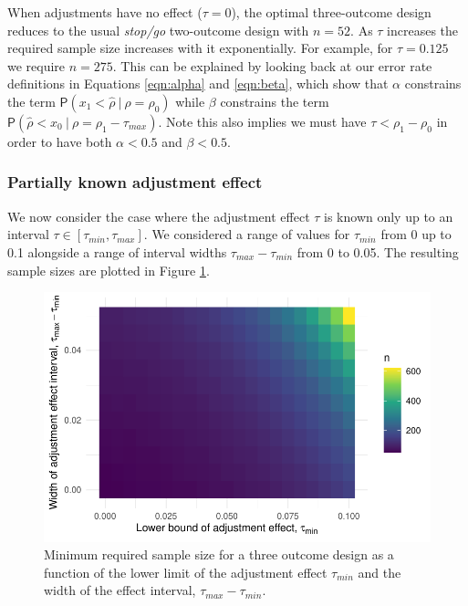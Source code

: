 \documentclass{bmcart}
\newcommand{\PR}{{\mathsf P}}
\begin{document}
When adjustments have no effect ($\tau = 0$), the optimal three-outcome design reduces to the usual \emph{stop/go} two-outcome design with $n = 52$. As $\tau$ increases the required sample size increases with it exponentially. For example, for $\tau = 0.125$ we require $n = 275$. This can be explained by looking back at our error rate definitions in Equations \ref{eqn:alpha} and \ref{eqn:beta}, which show that $\alpha$ constrains the term $\PR(x_1 < \hat{\rho} ~|~ \rho = \rho_0)$ while $\beta$ constrains the term $\PR(\hat{\rho} < x_0 ~|~ \rho = \rho_1 - \tau_{max})$. Note this also implies we must have $\tau < \rho_1 - \rho_0$ in order to have both $\alpha < 0.5$ and $\beta < 0.5$.

\subsubsection{Partially known adjustment effect}

We now consider the case where the adjustment effect $\tau$ is known only up to an interval $\tau \in [\tau_{min}, \tau_{max}]$. We considered a range of values for $\tau_{min}$ from 0 up to 0.1 alongside a range of interval widths $\tau_{max} - \tau_{min}$ from 0 to 0.05. The resulting sample sizes are plotted in Figure \ref{fig:tau_part_ns}.

\begin{figure}
\centering
\includegraphics[scale=0.8]{./figures/tau_part_ns}
\caption{Minimum required sample size for a three outcome design as a function of the lower limit of the adjustment effect $\tau_{min}$ and the width of the effect interval, $\tau_{max} - \tau_{min}$.}
\label{fig:tau_part_ns}
\end{figure}
\end{document}
